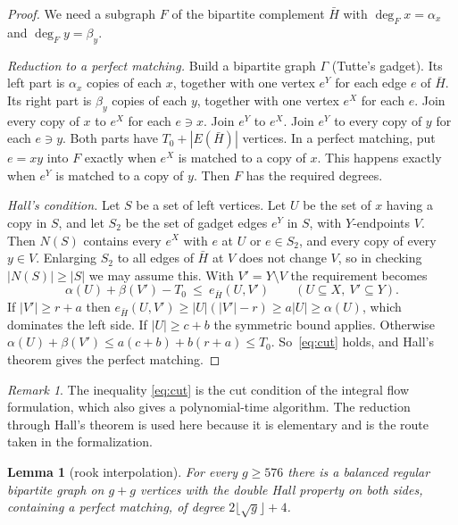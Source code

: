 \documentclass[11pt]{amsart}
\newtheorem{lemma}[theorem]{Lemma}
\theoremstyle{definition}
\theoremstyle{remark}
\newtheorem{remark}[theorem]{Remark}
\begin{document}
\begin{proof}
We need a subgraph $F$ of the bipartite complement $\bar H$ with $\deg_F x=\alpha_x$ and
$\deg_F y=\beta_y$.

\emph{Reduction to a perfect matching.} Build a bipartite graph $\Gamma$ (Tutte's gadget).
Its left part is $\alpha_x$ copies of each $x$, together with one vertex $e^Y$ for each edge
$e$ of $\bar H$. Its right part is $\beta_y$ copies of each $y$, together with one vertex
$e^X$ for each $e$. Join every copy of $x$ to $e^X$ for each $e\ni x$. Join $e^Y$ to $e^X$.
Join $e^Y$ to every copy of $y$ for each $e\ni y$. Both parts have $T_0+|E(\bar H)|$
vertices. In a perfect matching, put $e=xy$ into $F$ exactly when $e^X$ is matched to a
copy of $x$. This happens exactly when $e^Y$ is matched to a copy of $y$. Then $F$ has the
required degrees.

\emph{Hall's condition.} Let $S$ be a set of left vertices. Let $U$ be the set of $x$ having a
copy in $S$, and let $S_2$ be the set of gadget edges $e^Y$ in $S$, with $Y$-endpoints $V$.
Then $N(S)$ contains every $e^X$ with $e$ at $U$ or $e\in S_2$, and every copy of every
$y\in V$. Enlarging $S_2$ to all edges of $\bar H$ at $V$ does not change $V$, so in
checking $|N(S)|\ge|S|$ we may assume this. With $V'=Y\setminus V$ the requirement becomes
\begin{equation}\label{eq:cut}
  \alpha(U)+\beta(V')-T_0\ \le\ e_{\bar H}(U,V')\qquad(U\subseteq X,\ V'\subseteq Y).
\end{equation}
If $|V'|\ge r+a$ then $e_{\bar H}(U,V')\ge|U|(|V'|-r)\ge a|U|\ge\alpha(U)$, which
dominates the left side. If $|U|\ge c+b$ the symmetric bound applies. Otherwise
$\alpha(U)+\beta(V')\le a(c+b)+b(r+a)\le T_0$. So~\eqref{eq:cut} holds, and Hall's theorem
gives the perfect matching.
\end{proof}

\begin{remark}
The inequality \eqref{eq:cut} is the cut condition of the integral flow formulation, which
also gives a polynomial-time algorithm. The reduction through Hall's theorem is used here
because it is elementary and is the route taken in the formalization.
\end{remark}

\begin{lemma}[rook interpolation]\label{lem:rook-interp}
For every $g\ge576$ there is a balanced regular bipartite graph on $g+g$ vertices with the
double Hall property on both sides, containing a perfect matching, of degree
$2\lfloor\sqrt g\rfloor+4$.
\end{lemma}
\end{document}
